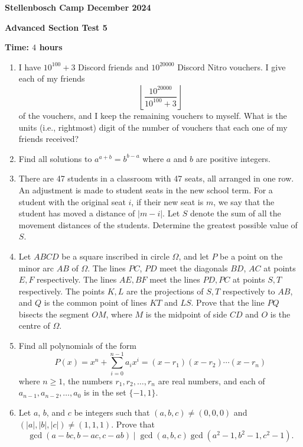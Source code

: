 \documentclass[12pt]{article}
\begin{document}
\begin{center} \large
    \textbf{Stellenbosch Camp December 2024}
    
    \textbf{Advanced Section Test 5}
    
    \textbf{Time: \(4\) hours}
\end{center}

\begin{enumerate}[topsep=2\bigskipamount,itemsep=\bigskipamount]
\item I have $10^{100}+3$ Discord friends and $10^{20000}$ Discord Nitro vouchers. I give each of my friends
\[\left\lfloor\frac{10^{20000}}{10^{100} + 3}\right\rfloor\] of the vouchers, and I keep the remaining vouchers to myself. What is the units (i.e., rightmost) digit of the number of vouchers that each one of my friends received?

\item Find all solutions to $a^{a+b} = b^{b-a}$ where $a$ and $b$ are positive integers.

\item There are 47 students in a classroom with 47 seats, all arranged in one row. 
An adjustment is made to student seats in the new school term.
For a student with the original seat $i$, if their new seat is $m$, we say that the student has moved a distance of $|m-i|$.
Let $S$ denote the sum of all the movement distances of the students. Determine the greatest possible value of $S$.

\item Let $ABCD$ be a square inscribed in circle $\Omega$, and let $P$ be a point on the minor arc $AB$ of $\Omega$.
The lines $PC$, $PD$ meet the diagonals $BD$, $AC$ at points $E, F$ respectively. The lines $AE, BF$ meet the lines $PD, PC$ at points $S, T$ respectively. The points $K, L$ are the projections of $S, T$ respectively to $AB$, and $Q$ is the common point of lines $KT$ and $LS$. Prove that the line $PQ$ bisects the segment $OM$, where $M$ is the midpoint of side $CD$ and $O$ is the centre of $\Omega$.

\item Find all polynomials of the form
\[P(x) = x^{n} + \sum_{i = 0}^{n - 1}a_{i}x^{i} = (x - r_{1})(x - r_{2})\cdots(x - r_{n})\]
where $n \geqslant 1$, the numbers $r_{1}, r_{2}, \ldots, r_{n}$ are real numbers, and each of $a_{n - 1}, a_{n - 2}, \ldots, a_{0}$ is in the set $\{-1, 1\}$.

\item Let \(a\), \(b\), and \(c\) be integers such that \((a, b, c) \neq (0, 0, 0)\) and \((|a|, |b|, |c|) \neq (1, 1, 1)\). Prove that
\[\gcd(a - bc, b - ac, c - ab) \mid \gcd(a, b, c)\gcd(a^{2} - 1, b^{2} - 1, c^{2} - 1).\]
\end{enumerate}
\end{document}
